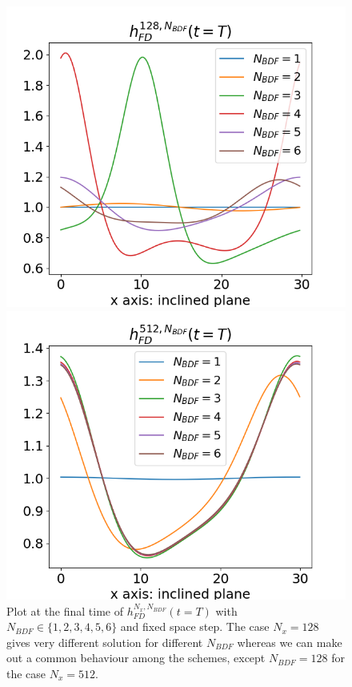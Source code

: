 \documentclass[12pt]{article}
\begin{document}
\begin{figure}[htbp]
    \centering
    \begin{minipage}[b]{0.49\textwidth}
        \centering
        \includegraphics[width=\textwidth]{Verif_scheme/plot_FD_BDF_Nx_128.png}
        \caption{$N_x = 128$}
        \label{fig:image1}
    \end{minipage}
    \hfill
    \begin{minipage}[b]{0.49\textwidth}
        \centering
        \includegraphics[width=\textwidth]{Verif_scheme/plot_FD_BDF_Nx_512.png}
        \caption{$N_x=512$}
        \label{fig:image2}
    \end{minipage}
    \caption{Plot at the final time of $h_{FD}^{N_x, N_{BDF}}(t=T)$ with $N_{BDF} \in \{1, 2, 3, 4, 5, 6\}$ and
    fixed space step. The case $N_x=128$ gives very different solution for different $N_{BDF}$ whereas we 
    can make out a common behaviour among the schemes, except $N_{BDF}=128$ for the case $N_x=512.$  }
    \label{fig:BDF_plot_128_512}
\end{figure}
\end{document}
